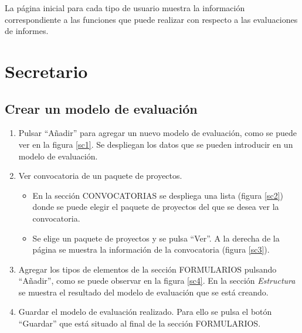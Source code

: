 \documentclass[12pt,a4paper,titlepage,spanish,twoside]{book}
\begin{document}
La página inicial para cada tipo de usuario muestra la información 
co\-rres\-pon\-dien\-te a las funciones que puede realizar con respecto a las 
evaluaciones de informes.


\section{Secretario}
\subsection{Crear un modelo de evaluación}
\begin{enumerate}
\item Pulsar ``Añadir'' para agregar un nuevo modelo de evaluación, como se 
  puede ver en la figura \ref{sc1}. Se despliegan los datos que se pueden 
  introducir en un modelo de evaluación.
  

\item Ver convocatoria de un paquete de proyectos.
  \begin{itemize}
  \item En la sección CONVOCATORIAS se despliega una lista (figura \ref{sc2}) 
    donde se puede elegir el paquete de proyectos del que se desea ver la 
    convocatoria.


  \item Se elige un paquete de proyectos y se pulsa ``Ver''. A la derecha de la 
    página se muestra la información de la convocatoria (figura \ref{sc3}).

  \end{itemize}

\item Agregar los tipos de elementos de la sección FORMULARIOS pulsando 
  ``Añadir'', como se puede observar en la figura \ref{sc4}. En la sección 
  \emph{Estructura} se muestra el resultado del modelo de evaluación que se
  está creando.


\item Guardar el modelo de evaluación realizado. Para ello se pulsa el botón 
  ``Guardar'' que está situado al final de la sección FORMULARIOS.
\end{enumerate}
\end{document}
